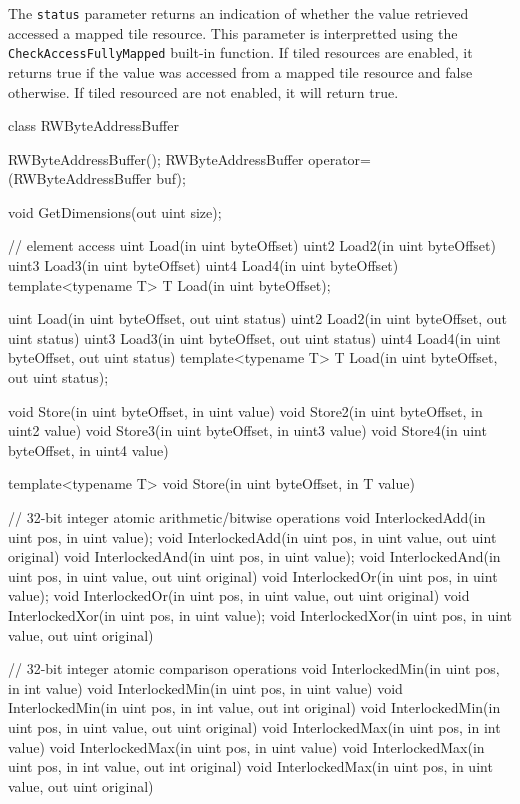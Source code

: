 The \texttt{status} parameter returns an indication of whether the value retrieved accessed a mapped tile
resource. This parameter is interpretted using the \texttt{CheckAccessFullyMapped}
built-in function. If tiled resources are enabled, it returns true if the value was accessed from a mapped
tile resource and false otherwise. If tiled resourced are not enabled, it will return true.


\begin{HLSL}
 class RWByteAddressBuffer {

   RWByteAddressBuffer();
   RWByteAddressBuffer operator=(RWByteAddressBuffer buf);

   void GetDimensions(out uint size);

   // element access
   uint Load(in uint byteOffset)
   uint2 Load2(in uint byteOffset)
   uint3 Load3(in uint byteOffset)
   uint4 Load4(in uint byteOffset)
   template<typename T>
   T Load(in uint byteOffset);

   uint Load(in uint byteOffset, out uint status)
   uint2 Load2(in uint byteOffset, out uint status)
   uint3 Load3(in uint byteOffset, out uint status)
   uint4 Load4(in uint byteOffset, out uint status)
   template<typename T>
   T Load(in uint byteOffset, out uint status);

   void Store(in uint byteOffset, in uint value)
   void Store2(in uint byteOffset, in uint2 value)
   void Store3(in uint byteOffset, in uint3 value)
   void Store4(in uint byteOffset, in uint4 value)

   template<typename T>
   void Store(in uint byteOffset, in T value)

   // 32-bit integer atomic arithmetic/bitwise operations
   void InterlockedAdd(in uint pos, in uint value);
   void InterlockedAdd(in uint pos, in uint value, out uint original)
   void InterlockedAnd(in uint pos, in uint value);
   void InterlockedAnd(in uint pos, in uint value, out uint original)
   void InterlockedOr(in uint pos, in uint value);
   void InterlockedOr(in uint pos, in uint value, out uint original)
   void InterlockedXor(in uint pos, in uint value);
   void InterlockedXor(in uint pos, in uint value, out uint original)

   // 32-bit integer atomic comparison operations
   void InterlockedMin(in uint pos, in int value)
   void InterlockedMin(in uint pos, in uint value)
   void InterlockedMin(in uint pos, in int value, out int original)
   void InterlockedMin(in uint pos, in uint value, out uint original)
   void InterlockedMax(in uint pos, in int value)
   void InterlockedMax(in uint pos, in uint value)
   void InterlockedMax(in uint pos, in int value, out int original)
   void InterlockedMax(in uint pos, in uint value, out uint original)

}
\end{HLSL}
